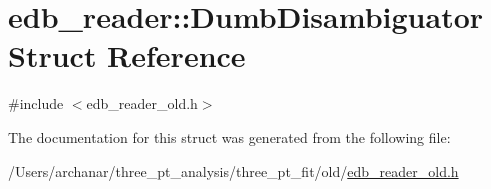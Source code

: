 \hypertarget{structedb__reader_1_1DumbDisambiguator}{}\section{edb\+\_\+reader\+:\+:Dumb\+Disambiguator Struct Reference}
\label{structedb__reader_1_1DumbDisambiguator}


{\ttfamily \#include $<$edb\+\_\+reader\+\_\+old.\+h$>$}



The documentation for this struct was generated from the following file\+:\begin{DoxyCompactItemize}
\item 
/\+Users/archanar/three\+\_\+pt\+\_\+analysis/three\+\_\+pt\+\_\+fit/old/\mbox{\hyperlink{edb__reader__old_8h}{edb\+\_\+reader\+\_\+old.\+h}}\end{DoxyCompactItemize}
